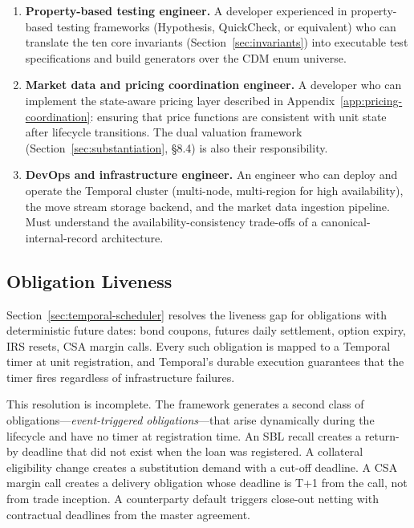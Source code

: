 \documentclass[11pt,a4paper]{article}
\begin{document}
\begin{enumerate}
\item \textbf{Property-based testing engineer.}
A developer experienced in property-based testing frameworks (Hypothesis, QuickCheck, or equivalent) who can translate the ten core invariants (Section~\ref{sec:invariants}) into executable test specifications and build generators over the CDM enum universe.

\item \textbf{Market data and pricing coordination engineer.}
A developer who can implement the state-aware pricing layer described in Appendix~\ref{app:pricing-coordination}: ensuring that price functions are consistent with unit state after lifecycle transitions. The dual valuation framework (Section~\ref{sec:substantiation}, \S8.4) is also their responsibility.

\item \textbf{DevOps and infrastructure engineer.}
An engineer who can deploy and operate the Temporal cluster (multi-node, multi-region for high availability), the move stream storage backend, and the market data ingestion pipeline. Must understand the availability-consistency trade-offs of a canonical-internal-record architecture.

\end{enumerate}

\clearpage
\subsection{Obligation Liveness}
\label{sec:obligation-liveness}

Section~\ref{sec:temporal-scheduler} resolves the liveness gap for obligations with deterministic future dates: bond coupons, futures daily settlement, option expiry, IRS resets, CSA margin calls. Every such obligation is mapped to a Temporal timer at unit registration, and Temporal's durable execution guarantees that the timer fires regardless of infrastructure failures.

This resolution is incomplete. The framework generates a second class of obligations---\emph{event-triggered obligations}---that arise dynamically during the lifecycle and have no timer at registration time. An SBL recall creates a return-by deadline that did not exist when the loan was registered. A collateral eligibility change creates a substitution demand with a cut-off deadline. A CSA margin call creates a delivery obligation whose deadline is T+1 from the call, not from trade inception. A counterparty default triggers close-out netting with contractual deadlines from the master agreement.
\end{document}
